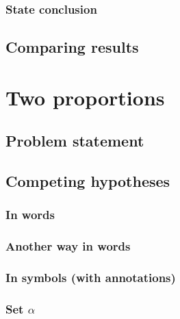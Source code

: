 \documentclass[12pt, krantz2,]{krantz}
\begin{document}
\hypertarget{state-conclusion-1}{%
\subsubsection*{State conclusion}\label{state-conclusion-1}}


\hypertarget{comparing-results-1}{%
\subsection{Comparing results}\label{comparing-results-1}}

\hypertarget{two-proportions}{%
\section{Two proportions}\label{two-proportions}}

\hypertarget{problem-statement-2}{%
\subsection{Problem statement}\label{problem-statement-2}}

\hypertarget{competing-hypotheses-2}{%
\subsection{Competing hypotheses}\label{competing-hypotheses-2}}

\hypertarget{in-words-2}{%
\subsubsection*{In words}\label{in-words-2}}


\hypertarget{another-way-in-words}{%
\subsubsection*{Another way in words}\label{another-way-in-words}}


\hypertarget{in-symbols-with-annotations-2}{%
\subsubsection*{In symbols (with annotations)}\label{in-symbols-with-annotations-2}}


\hypertarget{set-alpha-2}{%
\subsubsection*{\texorpdfstring{Set \(\alpha\)}{Set \textbackslash{}alpha}}\label{set-alpha-2}}
\end{document}
